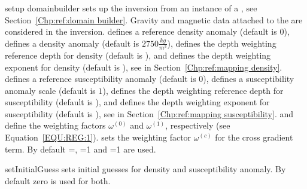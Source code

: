 \begin{methoddesc}[JointGravityMagneticInversion]{setup}{
domainbuilder
}
sets up the inversion from an instance  of a , see Section~\ref{Chp:ref:domain builder}.
Gravity and magnetic data attached to the  are considered in the inversion.
 defines a reference density anomaly (default is $0$),
 defines a density anomaly (default is $2750 \frac{kg}{m^3}$),
 defines the depth weighting reference depth for density (default is \None), and
 defines the depth weighting exponent for density (default is \None),
see  in Section~\ref{Chp:ref:mapping density}.
 defines a reference susceptibility anomaly (default is $0$),
 defines a susceptibility anomaly scale (default is $1$),
 defines the depth weighting reference depth for susceptibility (default is \None), and
 defines the depth weighting exponent for susceptibility (default is \None),
see  in Section~\ref{Chp:ref:mapping susceptibility}.
 and  define the weighting factors
$\omega^{(0)}$ and
$\omega^{(1)}$, respectively (see Equation~\ref{EQU:REG:1}). 
 sets the weighting factor $\omega^{(c)}$ for the cross gradient term. 
By default =\None, =1 and =1 are used.
\end{methoddesc}

\begin{methoddesc}[JointGravityMagneticInversion]{setInitialGuess}{ }
sets initial guesses for density and susceptibility anomaly.
By default zero is used for both.
\end{methoddesc}

